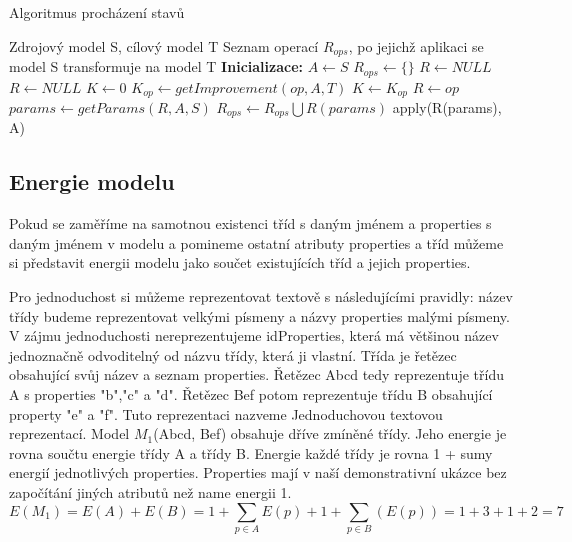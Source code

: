 \documentclass[11pt,twoside,a4paper]{book}
\begin{document}
\begin{algorithm}
\caption{Algoritmus procházení stavů}\label{algo:state}

\begin{algorithmic}[1]
\Require Zdrojový model S, cílový model T
\Ensure Seznam operací $R_{ops}$, po jejichž aplikaci se model S transformuje na
     model T
\Statex
\State \textbf{Inicializace:}
\State $A \gets S$ 
\State $R_{ops} \gets \{\}$
\State $R\gets NULL$ 
\Statex
  \Repeat \label{algo:state:repeat}
   \State $R\gets NULL$
   \State $K\gets 0$ \label{algo:state:improvement}
   	   
   	  \label{algo:state:forOps}
   	  \State $K_{op} \gets getImprovement(op, A, T)$ 
      	\Comment
      	  \State $K\gets K_{op}$
      	  \State $R \gets op$
      	\EndIf
      \EndFor \label{algo:state:forOpsEnd} 
       \label{algo:state:addOp}
         \State $params \gets getParams(R, A, S)$ \label{algo:state:getParams}
         \State $R_{ops}\gets R_{ops} \bigcup R(params)$
         \State apply(R(params), A)      
      \EndIf
   \label{algo:state:terminal_condition}
\end{algorithmic}

\end{algorithm}

\subsection{Energie modelu}
Pokud se zaměříme na samotnou existenci tříd s daným jménem a properties s
daným jménem v modelu a pomineme ostatní atributy properties a tříd můžeme si
představit energii modelu jako součet existujících tříd a jejich properties.

Pro jednoduchost si můžeme reprezentovat textově s následujícími pravidly:
název třídy budeme reprezentovat velkými písmeny a názvy properties
malými písmeny. V zájmu jednoduchosti nereprezentujeme
idProperties, která má většinou název jednoznačně odvoditelný od názvu třídy, která ji
vlastní. Třída je řetězec obsahující svůj název a seznam properties. Řetězec
Abcd tedy reprezentuje třídu A s properties "b","c" a "d". Řetězec Bef potom
reprezentuje třídu B obsahující property "e" a "f". Tuto reprezentaci
nazveme Jednoduchovou textovou reprezentací. Model $M_1$(Abcd, Bef) obsahuje
dříve zmíněné třídy.
Jeho energie je rovna součtu energie třídy A a třídy B. Energie každé třídy je
rovna 1 + sumy energií jednotlivých properties.
Properties mají v naší demonstrativní ukázce bez započítání jiných atributů než
name energii 1.
 $$E(M_1) = E(A) + E(B) = 1 + \sum_{p \in A}E(p) + 1 + \sum_{p
\in B}(E(p)) = 1 + 3 + 1 + 2 = 7$$
\end{document}
